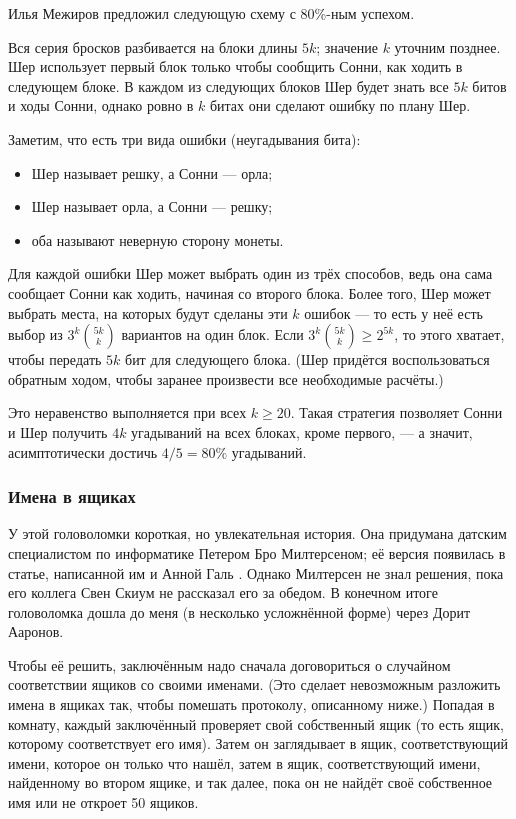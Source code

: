 \begin{addedbytheeditors}
Илья Межиров предложил следующую схему с 80\%-ным успехом.

Вся серия бросков разбивается на блоки длины $5k$; значение $k$ уточним позднее.
Шер использует первый блок только чтобы сообщить Сонни, как ходить в следующем блоке.
В каждом из следующих блоков Шер будет знать все $5k$ битов и ходы Сонни,
однако ровно в $k$ битах они сделают ошибку по плану Шер. 

Заметим, что есть три вида ошибки (неугадывания бита): 
\begin{itemize}
\item Шер называет решку, а Сонни --- орла;
\item Шер называет орла, а Сонни --- решку;
\item оба называют неверную сторону монеты.
\end{itemize}
Для каждой ошибки Шер может выбрать один из трёх способов,
ведь она сама сообщает Сонни как ходить, начиная со второго блока.
Более того, Шер может выбрать места, на которых будут сделаны эти $k$ ошибок --- то есть
у неё есть выбор из $3^k \binom{5k}{k}$ вариантов на один блок.
Если $3^k \binom{5k}{k}\ge 2^{5k}$, то этого хватает, чтобы передать $5k$ бит для следующего блока.
(Шер придётся воспользоваться обратным ходом, чтобы заранее произвести все необходимые расчёты.)

Это неравенство выполняется при всех $k\ge 20$.
Такая стратегия позволяет Сонни и Шер получить $4k$ угадываний на всех блоках, кроме первого, --- а значит, асимптотически достичь $4/5=80\%$ угадываний.
\pr
\end{addedbytheeditors}


\subsubsection*{Имена в ящиках}

У этой головоломки короткая, но увлекательная история.
Она придумана датским специалистом по информатике Петером Бро Милтерсеном;
её версия появилась в %
статье, написанной им и Анной Галь \cite{21}.
Однако Милтерсен не знал  решения, пока его коллега Свен Скиум не рассказал его за обедом.
В конечном итоге головоломка дошла до меня (в несколько усложнённой форме) через Дорит Ааронов.

Чтобы её решить, заключённым надо сначала договориться о случайном соответствии ящиков со своими именами.
(Это сделает невозможным разложить имена в ящиках так, чтобы помешать протоколу, описанному ниже.)
Попадая в комнату, каждый заключённый проверяет свой собственный ящик (то есть ящик, которому соответствует его имя).
Затем он заглядывает в ящик, соответствующий имени, которое он только что нашёл,
затем в ящик, соответствующий имени, найденному во втором ящике, и так далее, пока он не найдёт своё собственное имя или не откроет 50 ящиков.

